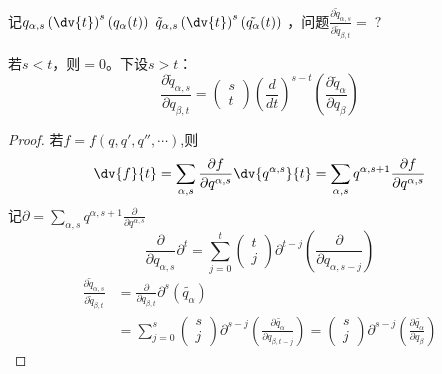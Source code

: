 \documentclass[12pt, a4paper, oneside, UTF8]{ctexbook}  %
\newcommand{\pa}{\partial}
\begin{document}
\begin{proposition}\label{拉氏量对广义坐标求导}
    记\(q_{\alpha,s}\left(\dv{t}\right)^s\left(q_\alpha(t)\right)\)
    \(\tilde{q}_{\alpha,s}\left(\dv{t}\right)^s\left(\tilde{q_\alpha}(t)\right)\)
    ，问题\(\displaystyle
        \frac{\pa \tilde{q}_{\alpha,s}}{\pa \tilde{q}_{\beta,t}}=\;?\qquad
\)

若\(s<t\)，则\(=0\)。下设\(s>t\)：
\[
\frac{\partial\tilde{q}_{\alpha, s}}{\partial q_{\beta,t}}=
\begin{pmatrix}
s \\
t
\end{pmatrix}
\left(\frac{d}{dt}\right)^{s-t}
\left(\frac{\partial\tilde{q}_\alpha}{\partial q_\beta}\right)
\]
\begin{proof}
若\(f=f(q,q',q'',\cdots)\),则
\[
\dv{f}{t}=\sum_{\alpha,s}\frac{\pa f}{\pa q^{\alpha,s}}\dv{q^{\alpha,s}}{t}
=\sum_{\alpha,s}q^{\alpha,s+1}\frac{\pa f}{\pa q^{\alpha,s}}
\]
记\(\pa =\sum_{\alpha,s}q^{\alpha,s+1}\frac{\pa }{\pa q^{\alpha,s}}\)
\[
    \frac{\partial}{\partial q_{\alpha,s}}\pa^t=
    \sum_{j=0}^{t}
    \begin{pmatrix}
    t\\
    j
    \end{pmatrix}
    \pa^{t-j}
    \left(\frac{\partial}{\partial q_{\alpha,s-j}}\right)
\]
\begin{align*}
    \frac{\pa \tilde{q}_{\alpha,s}}{\pa \tilde{q}_{\beta,t}}
    &=\frac{\pa }{\pa q_{\beta,t}}\pa ^s(\tilde{q_\alpha})\\
    &=\sum_{j=0}^{s}
    \begin{pmatrix}
    s\\
    j
    \end{pmatrix}
    \pa^{s-j}
    \left(\frac{\partial \tilde{q_\alpha}}{\partial q_{\beta,t-j}}\right)
    =\begin{pmatrix}
        s\\
        j
        \end{pmatrix}
        \pa^{s-j}
        \left(\frac{\partial \tilde{q_\alpha}}{\partial q_\beta}\right)    
\end{align*}
\end{proof}
\end{proposition}
\end{document}
